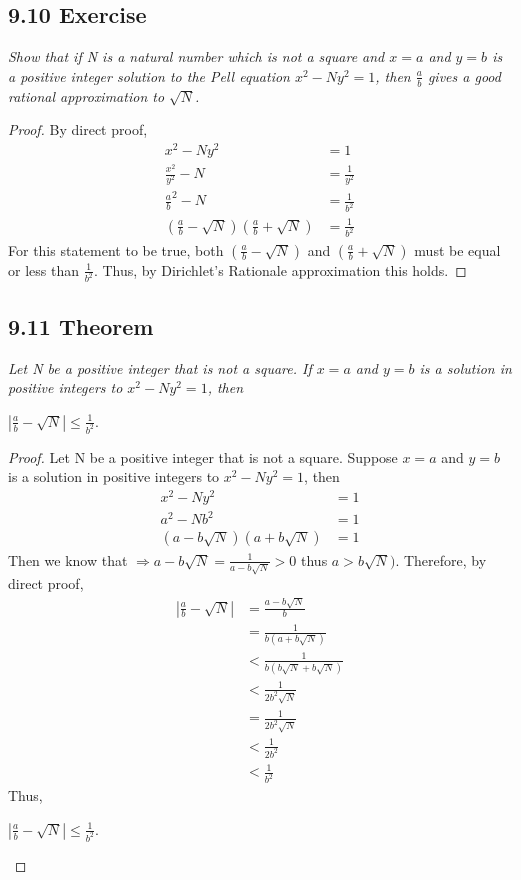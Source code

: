 \documentclass{article}
\begin{document}
\subsection*{9.10 Exercise} 
\quad \textit{Show that if N is a natural number which is not a square and $x = a$ and $y = b$ is a positive integer solution to the Pell equation $x^2 - Ny^2 = 1$, then $\frac{a}{b}$ gives a good rational approximation to $\sqrt{N}$.}

\begin{proof}
By direct proof,
\begin{align*}
    && x^2 - Ny^2 &= 1 &&\\
    && \frac{x^2}{y^2} - N &= \frac{1}{y^2}&&\\
    && \frac{a}{b}^2 - N &= \frac{1}{b^2} &&\\
    && (\frac{a}{b} - \sqrt{N}) (\frac{a}{b} + \sqrt{N}) &= \frac{1}{b^2} &&
\end{align*}
For this statement to be true, both $(\frac{a}{b} - \sqrt{N})$ and $(\frac{a}{b} + \sqrt{N})$ must be equal or less than $\frac{1}{b^2}$. Thus, by Dirichlet's Rationale approximation this holds.
\end{proof}

\subsection*{9.11 Theorem} 
\quad \textit{Let N be a positive integer that is not a square. If $x = a$ and $y = b$ is a solution in positive integers to $x^2 - Ny^2 = 1$, then}
\begin{center}
    $|\frac{a}{b}-\sqrt{N}| \leq \frac{1}{b^2}$.
\end{center}

\begin{proof}
Let N be a positive integer that is not a square. Suppose $x = a$ and $y = b$ is a solution in positive integers to $x^2 - Ny^2 = 1$, then
\begin{align*}
    && x^2 - Ny^2 &= 1 &&\\
    && a^2 - Nb^2 &= 1 &&\\
    && (a - b\sqrt{N})(a + b\sqrt{N}) &= 1 &&
\end{align*}
Then we know that $\Longrightarrow a - b\sqrt{N} = \frac{1}{a - b\sqrt{N}} > 0$ thus $a > b\sqrt{N})$. Therefore, by direct proof, 
\begin{align*}
    && |\frac{a}{b} - \sqrt{N}| &= \frac{a-b\sqrt{N}}{b} &&\\
    && &= \frac{1}{b(a + b\sqrt{N})} &&\\
    && &< \frac{1}{b(b\sqrt{N} + b\sqrt{N})} &&\\
    && &< \frac{1}{2b^2\sqrt{N}} &&\\
    && &= \frac{1}{2b^2\sqrt{N}} &&\\
    && &< \frac{1}{2b^2} &&\\
    && &< \frac{1}{b^2} &&
\end{align*}
Thus, 
\begin{center}
    $|\frac{a}{b}-\sqrt{N}| \leq \frac{1}{b^2}$.
\end{center}
\end{proof}
\end{document}
